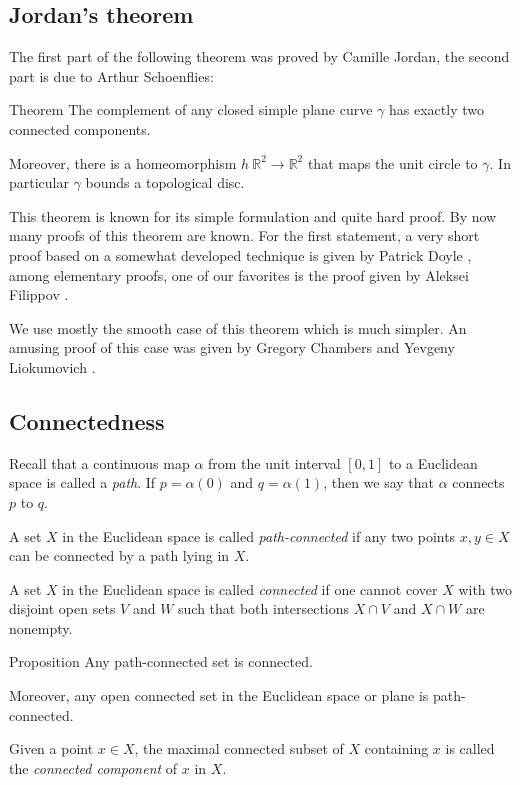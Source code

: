 \subsection*{Jordan's theorem}

The first part of the following theorem was proved by Camille Jordan, the second part is due to Arthur Schoenflies:

\begin{thm}{Theorem}\label{thm:jordan}
The complement of any closed simple plane curve $\gamma$ has exactly two connected components. 

Moreover, there is a homeomorphism $h\:\mathbb{R}^2\to \mathbb{R}^2$ that maps the unit circle to $\gamma$.
In particular $\gamma$ bounds a topological disc.
\end{thm}

This theorem is known for its simple formulation and quite hard proof.
By now many proofs of this theorem are known.
For the first statement, a very short proof based on a somewhat developed technique is given by Patrick Doyle \cite{doyle},
among elementary proofs, one of our favorites is the proof given by Aleksei Filippov \cite{filippov}.

We use mostly the smooth case of this theorem which is much simpler.
An amusing proof of this case was given by Gregory Chambers and Yevgeny Liokumovich \cite{chambers-liokumovich}.

\subsection*{Connectedness}

Recall that a continuous map $\alpha$ from the unit interval $[0,1]$ to a Euclidean space is called a \emph{path}.
If $p=\alpha (0)$ and $q = \alpha (1)$, then we say that $\alpha$ connects $p$ to $q$.


A set $X$ in the Euclidean space is called \emph{path-connected} if any two points $x,y\in X$ can be connected by a path lying in $X$.

A set $X$ in the Euclidean space is called \emph{connected} if one cannot cover $X$ with two disjoint open sets $V$ and $W$ such that both intersections $X\cap V$ and $X\cap W$ are nonempty.

\begin{thm}{Proposition}
Any path-connected set is connected.

Moreover, any open connected set in the Euclidean space or plane is path-connected.
\end{thm}

Given a point $x\in X$, the maximal connected subset of $X$ containing $x$ is called the \emph{connected component} of $x$ in $X$.
